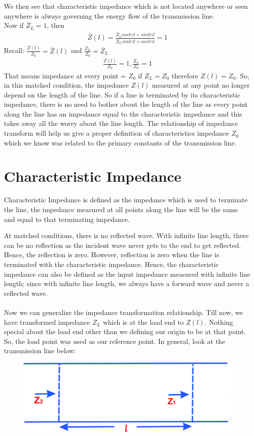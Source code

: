 We then see that characteristic impedance which is not located anywhere or seen anywhere is always governing the energy flow of the transmission line.\\
Now if $\bar{Z}_L = 1$, then 
\begin{align*}
\bar{Z}(l) = {\frac{\bar{Z}_Lcosh\gamma l + sinh\gamma l}{\bar{Z}_Lsinh\gamma l + cosh\gamma l}} = 1
\end{align*}
Recall: $\frac{Z(l)}{Z_0} = \bar{Z}(l)$ and $\frac{Z_L}{Z_0} = \bar{Z}_L$\\
\begin{align*}
\frac{Z(l)}{Z_0} = 1,\frac{Z_L}{Z_0} = 1
\end{align*}
That means impedance at every point = $Z_0$ if $Z_L = Z_0$ therefore $Z(l) = Z_0$. So, in this matched condition, the impedance $Z(l)$ measured at any point no longer depend on the length of the line. So if a line is terminated by its characteristic impedance, there is no need to bother about the length of the line as every point along the line has an impedance equal to the characteristic impedance and this takes away all the worry about the line length.
The relationship of impedance transform will help us give a proper definition of characteristics impedance $Z_0$ which we know was related to the primary constants of the transmission line.
\section{Characteristic Impedance}  
Characteristic Impedance is defined as the impedance which is used to terminate the line, the impedance measured at all points along the line will be the same and equal to that terminating impedance.

At matched conditions, there is no reflected wave. With infinite line length, there can be no reflection as the incident wave never gets to the end to get reflected. Hence, the reflection is zero. However, reflection is zero when the line is terminated with the characteristic impedance. Hence, the characteristic impedance can also be defined as the input impedance measured with infinite line length; since with infinite line length, we always have a forward wave and never a reflected wave.\\\\
Now we can generalize the impedance transformation relationship. Till now, we have transformed impedance $Z_L$ which is at the load end to $Z(l)$. Nothing special about the load end other than we defining our origin to be at that point. So, the load point was used as our reference point. In general, look at the transmission line below:
\begin{figure}[h]
\centering
\includegraphics[scale=0.45]{./graphics/1234}
\caption{}
\end{figure}

